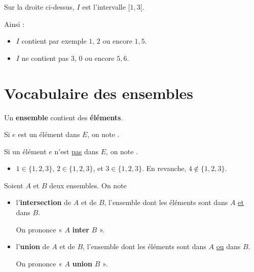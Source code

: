 \documentclass[classe=$2^{de}$]{coursclass}
\begin{document}
\begin{exemple}
	\begin{center}
	\end{center}

	Sur la droite ci-dessus, $I$ est l'intervalle $[1, 3[$.

	Ainsi :
	\begin{itemize}
		\item $I$ contient par exemple $1$, $2$ ou encore $1,5$.
		\item $I$ ne contient pas $3$, $0$ ou encore $5,6$.
	\end{itemize}
\end{exemple}

\section{Vocabulaire des ensembles}

\begin{definition}
	Un \textbf{ensemble} contient des \textbf{éléments}.

	Si $e$ est un élément dans $E$, on note .

	Si un élément $e$ n'est \uline{pas} dans $E$, on note .
\end{definition}

\begin{exemple}
	\begin{itemize}
		\item $1 ∈ \{1, 2, 3\}$, $2 ∈ \{1, 2, 3\}$, et $3 ∈ \{1, 2, 3\}$. En revanche, $4 ∉ \{1, 2, 3\}$.
	\end{itemize}
\end{exemple}

\begin{definition}
	Soient $A$ et $B$ deux ensembles. On note
	\begin{itemize}
		\item {} l'\textbf{intersection} de $A$ et de $B$, l'ensemble dont les éléments sont dans $A$ \uline{et} dans $B$.

		      On prononce « $A$ \textbf{inter} $B$ ».
		\item {} l'\textbf{union} de $A$ et de $B$, l'ensemble dont les éléments sont dans $A$ \uline{ou} dans $B$.

		      On prononce « $A$ \textbf{union} $B$ ».
	\end{itemize}
\end{definition}
\end{document}
